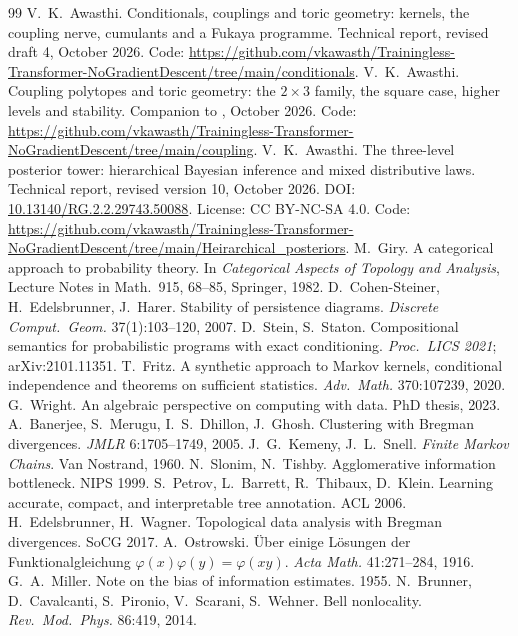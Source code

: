\documentclass[11pt]{article}
\theoremstyle{definition}
\theoremstyle{remark}
\begin{document}
\begin{thebibliography}{99}
 V.~K.~Awasthi. Conditionals, couplings and toric geometry: kernels, the coupling nerve, cumulants and a Fukaya programme. Technical report, revised draft 4, October 2026. Code: \url{https://github.com/vkawasth/Trainingless-Transformer-NoGradientDescent/tree/main/conditionals}.
 V.~K.~Awasthi. Coupling polytopes and toric geometry: the $2\times3$ family, the square case, higher levels and stability. Companion to \cite{awasthiC}, October 2026. Code: \url{https://github.com/vkawasth/Trainingless-Transformer-NoGradientDescent/tree/main/coupling}.
 V.~K.~Awasthi. The three-level posterior tower: hierarchical Bayesian inference and mixed distributive laws. Technical report, revised version 10, October 2026. DOI: \href{https://doi.org/10.13140/RG.2.2.29743.50088}{10.13140/RG.2.2.29743.50088}. License: CC BY-NC-SA 4.0. Code: \url{https://github.com/vkawasth/Trainingless-Transformer-NoGradientDescent/tree/main/Heirarchical_posteriors}.
 M.~Giry. A categorical approach to probability theory. In \emph{Categorical Aspects of Topology and Analysis}, Lecture Notes in Math.\ 915, 68--85, Springer, 1982.
 D.~Cohen-Steiner, H.~Edelsbrunner, J.~Harer. Stability of persistence diagrams. \emph{Discrete Comput.\ Geom.} 37(1):103--120, 2007.
 D.~Stein, S.~Staton. Compositional semantics for probabilistic programs with exact conditioning. \emph{Proc.\ LICS 2021}; arXiv:2101.11351.
 T.~Fritz. A synthetic approach to Markov kernels, conditional independence and theorems on sufficient statistics. \emph{Adv.\ Math.} 370:107239, 2020.
 G.~Wright. An algebraic perspective on computing with data. PhD thesis, 2023.
 A.~Banerjee, S.~Merugu, I.~S.~Dhillon, J.~Ghosh. Clustering with Bregman divergences. \emph{JMLR} 6:1705--1749, 2005.
 J.~G.~Kemeny, J.~L.~Snell. \emph{Finite Markov Chains}. Van Nostrand, 1960.
 N.~Slonim, N.~Tishby. Agglomerative information bottleneck. NIPS 1999.
 S.~Petrov, L.~Barrett, R.~Thibaux, D.~Klein. Learning accurate, compact, and interpretable tree annotation. ACL 2006.
 H.~Edelsbrunner, H.~Wagner. Topological data analysis with Bregman divergences. SoCG 2017.
 A.~Ostrowski. \"Uber einige L\"osungen der Funktionalgleichung $\varphi(x)\varphi(y)=\varphi(xy)$. \emph{Acta Math.} 41:271--284, 1916.
 G.~A.~Miller. Note on the bias of information estimates. 1955.
 N.~Brunner, D.~Cavalcanti, S.~Pironio, V.~Scarani, S.~Wehner. Bell nonlocality. \emph{Rev.\ Mod.\ Phys.} 86:419, 2014.

\end{thebibliography}
\end{document}
